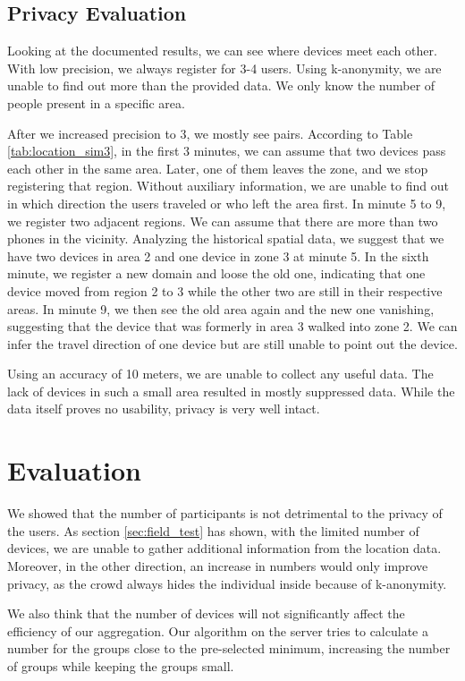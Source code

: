 \subsection{Privacy Evaluation}
Looking at the documented results, we can see where devices meet each other. With low precision, we always register for 3-4 users. Using k-anonymity, we are unable to find out more than the provided data. We only know the number of people present in a specific area. 

After we increased precision to 3, we mostly see pairs. According to Table \ref{tab:location_sim3}, in the first 3 minutes, we can assume that two devices pass each other in the same area. Later, one of them leaves the zone, and we stop registering that region. Without auxiliary information, we are unable to find out in which direction the users traveled or who left the area first. In minute 5 to 9, we register two adjacent regions. We can assume that there are more than two phones in the vicinity. Analyzing the historical spatial data, we suggest that we have two devices in area 2 and one device in zone 3 at minute 5. In the sixth minute, we register a new domain and loose the old one, indicating that one device moved from region 2 to 3 while the other two are still in their respective areas. In minute 9, we then see the old area again and the new one vanishing, suggesting that the device that was formerly in area 3 walked into zone 2. We can infer the travel direction of one device but are still unable to point out the device.

Using an accuracy of 10 meters, we are unable to collect any useful data. The lack of devices in such a small area resulted in mostly suppressed data. While the data itself proves no usability, privacy is very well intact.

\section{Evaluation}
We showed that the number of participants is not detrimental to the privacy of the users. As section \ref{sec:field_test} has shown, with the limited number of devices, we are unable to gather additional information from the location data. Moreover, in the other direction, an increase in numbers would only improve privacy, as the crowd always hides the individual inside because of k-anonymity.

We also think that the number of devices will not significantly affect the efficiency of our aggregation. Our algorithm on the server tries to calculate a number for the groups close to the pre-selected minimum, increasing the number of groups while keeping the groups small.

